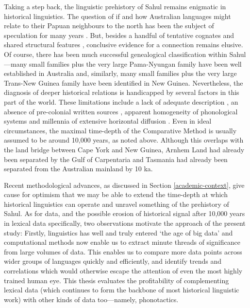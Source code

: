 Taking a step back, the linguistic prehistory of Sahul remains enigmatic in historical linguistics. The question of if and how Australian languages might relate to their Papuan neighbours to the north has been the subject of speculation for many years \autocites[e.g.][]{ogrady_languages_1966}{wurm_papuan_1975}. But, besides a handful of tentative cognates \autocite{foley_papuan_1986} and shared structural features \autocites{nichols_sprung_1997}{reesink_explaining_2009}, conclusive evidence for a connection remains elusive. Of course, there has been much successful genealogical classification within Sahul---many small families plus the very large Pama-Nyungan family have been well established in Australia and, similarly, many small families plus the very large Trans-New Guinea family have been identified in New Guinea. Nevertheless, the diagnosis of deeper historical relations is handicapped by several factors in this part of the world. These limitations include a lack of adequate description \autocite{bowern_computational_2012}, an absence of pre-colonial written sources \autocite{foley_papuan_1986}, apparent homogeneity of phonological systems \autocites{baker_word_2014}{round_segment_2021}{round_phonotactics_2021} and millennia of extensive horizontal diffusion \autocites{foley_papuan_1986}{dixon_australian_2002} \autocite[although the extent to which this horizontal diffusion exists may be disputed. c.f.][]{bowern_does_2011}. Even in ideal circumstances, the maximal time-depth of the Comparative Method is usually assumed to be around 10,000 years, as noted above. Although this overlaps with the land bridge between Cape York and New Guinea, Arnhem Land had already been separated by the Gulf of Carpentaria and Tasmania had already been separated from the Australian mainland by 10 ka.

Recent methodological advances, as discussed in Section \ref{academic-context}, give cause for optimism that we may be able to extend the time-depth at which historical linguistics can operate and unravel something of the prehistory of Sahul. As for data, and the possible erosion of historical signal after 10,000 years in lexical data specifically, two observations motivate the approach of the present study: Firstly, linguistics has well and truly entered `the age of big data' and computational methods now enable us to extract minute threads of significance from large volumes of data. This enables us to compare more data points across wider groups of languages quickly and efficiently, and identify trends and correlations which would otherwise escape the attention of even the most highly trained human eye. This thesis evaluates the profitability of complementing lexical data (which continues to form the backbone of most historical linguistic work) with other kinds of data too---namely, phonotactics.

